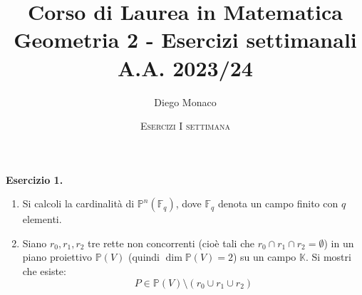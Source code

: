\documentclass[12pt]{article}
\theoremstyle{remark}
\theoremstyle{definition}
\newcommand{\PP}{\mathbb{P}}
\newcommand{\FF}{\mathbb{F}}
\newcommand{\KK}{\mathbb{K}}
\begin{document}
\title{\large{\textbf{Corso di Laurea in Matematica \\
Geometria 2 - Esercizi settimanali A.A. 2023/24}}}
\date{\textsc{Esercizi I settimana}}
\author{Diego Monaco}
\maketitle

\noindent \textbf{Esercizio 1.}
\vspace{-2mm}
\begin{enumerate}[(1)]
    \item Si calcoli la cardinalità di $\PP^n(\FF_q)$, dove $\FF_q$ denota un campo finito con $q$ elementi.
    \item Siano $r_0,r_1,r_2$ tre rette non concorrenti (cioè tali che $r_0 \cap r_1 \cap r_2 = \emptyset$) in un piano proiettivo $\PP(V)$ (quindi $\dim \PP(V) = 2$) su un campo $\KK$.
    Si mostri che esiste:
    \[ P \in \PP(V)\setminus(r_0 \cup r_1 \cup r_2)
        \]
\end{enumerate}
\end{document}
